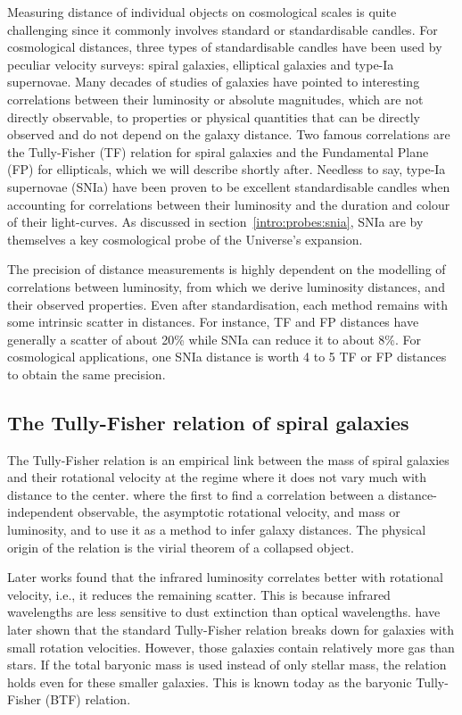 Measuring distance of individual objects on cosmological scales is quite challenging
since it commonly involves standard or standardisable candles. 
For cosmological distances, three types of standardisable candles have been used by
peculiar velocity surveys: spiral galaxies, elliptical galaxies and type-Ia supernovae. 
Many decades of studies of galaxies have pointed to interesting correlations 
between their luminosity or absolute magnitudes, which are not directly observable,
to properties or physical quantities that can be directly observed and do not depend on 
the galaxy distance. 
Two famous correlations are the Tully-Fisher (TF) relation for spiral galaxies 
and the Fundamental Plane (FP) for ellipticals, which we will describe shortly after. 
Needless to say, type-Ia supernovae (SNIa) have been proven to be excellent standardisable candles
when accounting for correlations between their luminosity and the duration and colour of their light-curves. 
As discussed in section~\ref{intro:probes:snia}, SNIa are by themselves a key cosmological probe of 
the Universe's expansion. 

The precision of distance measurements is highly dependent on the modelling of correlations 
between luminosity, from which we derive luminosity distances, and their observed properties. 
Even after standardisation, each method remains with some intrinsic scatter in distances. 
For instance, TF and FP distances have generally a scatter of about 20\% while SNIa 
can reduce it to about 8\%. For cosmological applications, one SNIa distance is worth 4 to 5 
TF or FP distances to obtain the same precision. 
 

    \subsection{The Tully-Fisher relation of spiral galaxies} 
    \label{velocities:measuring:tf}
    
    The Tully-Fisher relation is an empirical link between the mass of spiral galaxies 
    and their rotational velocity at the regime where it does not vary much with distance to 
    the center. \cite{tullyNewMethodDetermining1977} where the first to find a correlation 
    between a distance-independent observable, the asymptotic rotational velocity, and 
    mass or luminosity, and to use it as a method to infer galaxy distances. 
    The physical origin of the relation is the virial theorem of a collapsed object. 

    Later works found that the infrared luminosity correlates better with rotational 
    velocity, i.e., it reduces the remaining scatter. This is because infrared wavelengths 
    are less sensitive to dust extinction than optical wavelengths.  
    \cite{mcgaughBaryonicTullyFisherRelation2000} have later shown that the standard 
    Tully-Fisher relation breaks down for galaxies with small rotation velocities. 
    However, those galaxies contain relatively more gas than stars. If the total baryonic mass 
    is used instead of only stellar mass, the relation holds even for these smaller galaxies. 
    This is known today as the baryonic Tully-Fisher (BTF) relation. 

